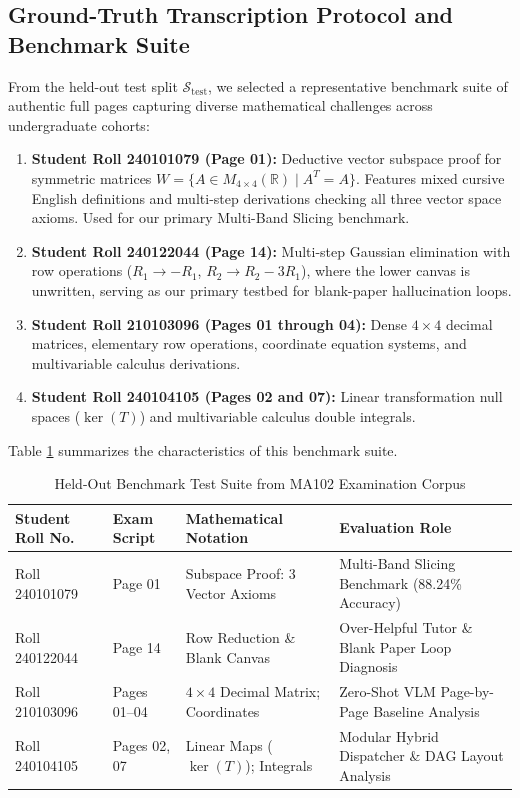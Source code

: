 \subsection{Ground-Truth Transcription Protocol and Benchmark Suite}
From the held-out test split $\mathcal{S}_{\text{test}}$, we selected a representative benchmark suite of authentic full pages capturing diverse mathematical challenges across undergraduate cohorts:
\begin{enumerate}
    \item \textbf{Student Roll 240101079 (Page 01):} Deductive vector subspace proof for symmetric matrices $W = \{ A \in M_{4 \times 4}(\mathbb{R}) \mid A^T = A \}$. Features mixed cursive English definitions and multi-step derivations checking all three vector space axioms. Used for our primary Multi-Band Slicing benchmark.
    \item \textbf{Student Roll 240122044 (Page 14):} Multi-step Gaussian elimination with row operations ($R_1 \to -R_1$, $R_2 \to R_2 - 3R_1$), where the lower canvas is unwritten, serving as our primary testbed for blank-paper hallucination loops.
    \item \textbf{Student Roll 210103096 (Pages 01 through 04):} Dense $4 \times 4$ decimal matrices, elementary row operations, coordinate equation systems, and multivariable calculus derivations.
    \item \textbf{Student Roll 240104105 (Pages 02 and 07):} Linear transformation null spaces ($\ker(T)$) and multivariable calculus double integrals.
\end{enumerate}

Table \ref{tab:benchmark_suite_summary} summarizes the characteristics of this benchmark suite.

\begin{table}[htbp]
\centering
\caption{Held-Out Benchmark Test Suite from MA102 Examination Corpus}
\label{tab:benchmark_suite_summary}
\vspace{0.2cm}
\small
\begin{tabular}{p{2.6cm}p{2.2cm}p{4.2cm}p{4.8cm}}
\toprule
\textbf{Student Roll No.} & \textbf{Exam Script} & \textbf{Mathematical Notation} & \textbf{Evaluation Role} \\
\midrule
Roll 240101079 & Page 01 & Subspace Proof: 3 Vector Axioms & Multi-Band Slicing Benchmark (88.24\% Accuracy) \\
\addlinespace
Roll 240122044 & Page 14 & Row Reduction \& Blank Canvas & Over-Helpful Tutor \& Blank Paper Loop Diagnosis \\
\addlinespace
Roll 210103096 & Pages 01--04 & $4 \times 4$ Decimal Matrix; Coordinates & Zero-Shot VLM Page-by-Page Baseline Analysis \\
\addlinespace
Roll 240104105 & Pages 02, 07 & Linear Maps ($\ker(T)$); Integrals & Modular Hybrid Dispatcher \& DAG Layout Analysis \\
\bottomrule
\end{tabular}
\end{table}

